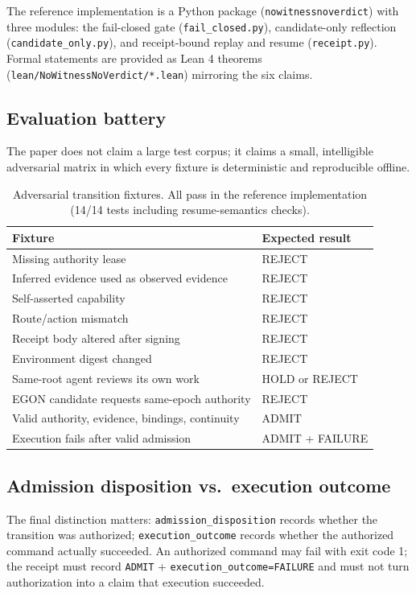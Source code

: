 The reference implementation is a Python package
(\texttt{nowitnessnoverdict}) with three modules: the fail-closed gate
(\texttt{fail\_closed.py}), candidate-only reflection
(\texttt{candidate\_only.py}), and receipt-bound replay and resume
(\texttt{receipt.py}). Formal statements are provided as Lean 4 theorems
(\texttt{lean/NoWitnessNoVerdict/*.lean}) mirroring the six claims.

\subsection{Evaluation battery}

The paper does not claim a large test corpus; it claims a small,
intelligible adversarial matrix in which every fixture is deterministic
and reproducible offline.

\begin{table}[h]
\centering
\begin{tabular}{ll}
\toprule
\textbf{Fixture} & \textbf{Expected result} \\
\midrule
Missing authority lease & REJECT \\
Inferred evidence used as observed evidence & REJECT \\
Self-asserted capability & REJECT \\
Route/action mismatch & REJECT \\
Receipt body altered after signing & REJECT \\
Environment digest changed & REJECT \\
Same-root agent reviews its own work & HOLD or REJECT \\
EGON candidate requests same-epoch authority & REJECT \\
Valid authority, evidence, bindings, continuity & ADMIT \\
Execution fails after valid admission & ADMIT + FAILURE \\
\bottomrule
\end{tabular}
\caption{Adversarial transition fixtures. All pass in the reference
implementation (14/14 tests including resume-semantics checks).}
\label{tab:matrix}
\end{table}

\subsection{Admission disposition vs.\ execution outcome}

The final distinction matters: \texttt{admission\_disposition} records
whether the transition was authorized; \texttt{execution\_outcome} records
whether the authorized command actually succeeded. An authorized command
may fail with exit code 1; the receipt must record
\texttt{ADMIT} + \texttt{execution\_outcome=FAILURE} and must not turn
authorization into a claim that execution succeeded.

